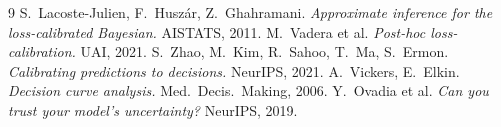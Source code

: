 \documentclass[11pt]{article}
\theoremstyle{definition}
\begin{document}
\begin{thebibliography}{9}
 S.~Lacoste-Julien, F.~Husz\'ar, Z.~Ghahramani.
\emph{Approximate inference for the loss-calibrated Bayesian.} AISTATS, 2011.
 M.~Vadera et al. \emph{Post-hoc loss-calibration.} UAI, 2021.
 S.~Zhao, M.~Kim, R.~Sahoo, T.~Ma, S.~Ermon. \emph{Calibrating predictions to
decisions.} NeurIPS, 2021.
 A.~Vickers, E.~Elkin. \emph{Decision curve analysis.} Med.\ Decis.\ Making, 2006.
 Y.~Ovadia et al. \emph{Can you trust your model's uncertainty?} NeurIPS, 2019.
\end{thebibliography}
\end{document}
